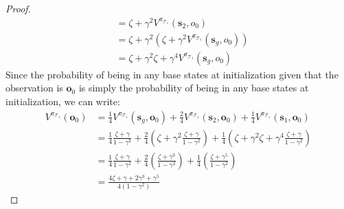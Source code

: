 \begin{proof}
\begin{align*}
        &= \zeta + \gamma^2 V^{\pi_{\mathcal{T}_1}} (\boldsymbol{s}_2, o_0) \\
        &= \zeta + \gamma^2 (\zeta + \gamma^2 V^{\pi_{\mathcal{T}_1}} (\boldsymbol{s}_g, o_0)) \\
        &= \zeta + \gamma^2 \zeta + \gamma^4 V^{\pi_{\mathcal{T}_1}} (\boldsymbol{s}_g, o_0)
    \end{align*}
    Since the probability of being in any base states at initialization given that the observation is $\boldsymbol{o}_0$ is simply the probability of being in any base states at initialization, we can write:
    \begin{align*}
        V^{\pi_{\mathcal{T}_1}} (\boldsymbol{o}_0) &= \frac{1}{4} V^{\pi_{\mathcal{T}_1}} (\boldsymbol{s}_g, \boldsymbol{o}_0) + \frac{2}{4} V^{\pi_{\mathcal{T}_1}} (\boldsymbol{s}_2, \boldsymbol{o}_0) + \frac{1}{4} V^{\pi_{\mathcal{T}_1}} (\boldsymbol{s}_1, \boldsymbol{o}_0) \\
        &= \frac{1}{4} \frac{\zeta + \gamma}{1 - \gamma^2} + \frac{2}{4} (\zeta + \gamma^2 \frac{\zeta + \gamma}{1 - \gamma^2}) + \frac{1}{4} (\zeta + \gamma^2 \zeta + \gamma^4 \frac{\zeta + \gamma}{1 - \gamma^2}) \\
        &= \frac{1}{4} \frac{\zeta + \gamma}{1 - \gamma^2} + \frac{2}{4} (\frac{\zeta + \gamma ^ 3}{1-\gamma^2}) + \frac{1}{4}(\frac{\zeta+\gamma^5}{1-\gamma^2}) \\
        &= \frac{4\zeta + \gamma + 2\gamma^3 + \gamma^5}{4(1-\gamma^2)}
    \end{align*}
    \end{proof}

